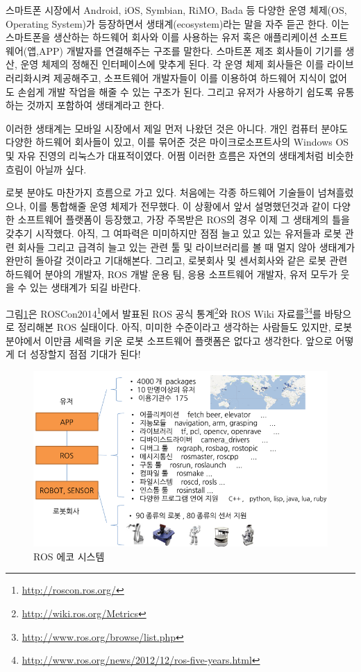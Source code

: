 스마트폰 시장에서 Android, iOS,  Symbian, RiMO, Bada 등 다양한 운영 체제(OS, Operating System)가 등장하면서 생태계(ecosystem)라는 말을 자주 듣곤 한다.
이는 스마트폰을 생산하는 하드웨어 회사와 이를 사용하는 유저 혹은 애플리케이션 소프트웨어(앱,APP) 개발자를 연결해주는 구조를 말한다.
스마트폰 제조 회사들이 기기를 생산, 운영 체제의 정해진 인터페이스에 맞추게 된다.
각 운영 체제 회사들은 이를 라이브러리화시켜 제공해주고, 소프트웨어 개발자들이 이를 이용하여 하드웨어 지식이 없어도 손쉽게 개발 작업을 해줄 수 있는 구조가 된다.
그리고 유저가 사용하기 쉽도록 유통하는 것까지 포함하여 생태계라고 한다.

이러한 생태계는 모바일 시장에서 제일 먼저 나왔던 것은 아니다.
개인 컴퓨터 분야도 다양한 하드웨어 회사들이 있고, 이를 묶어준 것은 마이크로소프트사의 Windows OS 및 자유 진영의 리눅스가 대표적이였다.
어쩜 이러한 흐름은 자연의 생태계처럼 비슷한 흐림이 아닐까 싶다. 

로봇 분야도 마찬가지 흐름으로 가고 있다.
처음에는 각종 하드웨어 기술들이 넘쳐흘렀으나, 이를 통합해줄 운영 체제가 전무했다.
이 상황에서 앞서 설명했던것과 같이 다양한 소프트웨어 플랫폼이 등장했고, 가장 주목받은 ROS의 경우 이제 그 생태계의 틀을 갖추기 시작했다.
아직, 그 여파력은 미미하지만 점점 늘고 있고 있는 유저들과 로봇 관련 회사들 그리고 급격히 늘고 있는 관련 툴 및 라이브러리를 볼 때 멀지 않아 생태계가 완만히 돌아갈 것이라고 기대해본다.
그리고, 로봇회사 및 센서회사와 같은 로봇 관련 하드웨어 분야의 개발자, ROS 개발 운용 팀, 응용 소프트웨어 개발자, 유저 모두가 웃을 수 있는 생태계가 되길 바란다.
 
그림\ref{fig:ros_ecosystem}은 ROSCon2014\footnote{\url{http://roscon.ros.org/}}에서 발표된 ROS 공식 통계\footnote{\url{http://wiki.ros.org/Metrics}}와 ROS Wiki 자료를\footnote{\url{http://www.ros.org/browse/list.php}}\footnote{\url{http://www.ros.org/news/2012/12/ros-five-years.html}}를 바탕으로 정리해본 ROS 실태이다.
아직, 미미한 수준이라고 생각하는 사람들도 있지만, 로봇 분야에서 이만큼 세력을 키운 로봇 소프트웨어 플랫폼은 없다고 생각한다.
앞으로 어떻게 더 성장할지 점점 기대가 된다!

\begin{figure}[h]
\centering\includegraphics[width=\columnwidth]{pictures/chapter1/ecosystem.png}
\caption{ROS 에코 시스템}
\label{fig:ros_ecosystem}
\end{figure}

